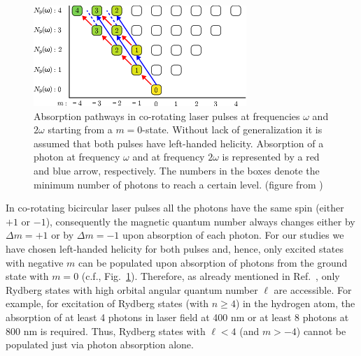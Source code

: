 \begin{figure}[!ht]
 \centering
  \includegraphics[width=0.75\columnwidth]{figs/Rydberg/co_rotating_absorbtion.png}
 \caption{\label{fig:co-pathways}
 Absorption pathways in co-rotating laser pulses at frequencies $\omega$ and $2 \omega$ starting from a $m=0$-state. Without lack of generalization it is assumed that both pulses have left-handed helicity. Absorption of a photon at frequency $\omega$ and at frequency $2 \omega$ is represented by a red and blue arrow, respectively. The numbers in the boxes denote the minimum number of photons to reach a certain level. (figure from \cite{venzke2020_ryd})
 }
 \end{figure}

In co-rotating bicircular laser pulses all the photons have the same spin (either $+1$ or $-1$), consequently the magnetic quantum number always changes either by $\Delta m = +1$ or by $\Delta m = -1$ upon absorption of each photon. For our studies we have chosen left-handed helicity for both pulses and, hence, only excited states with negative $m$ can be populated upon absorption of photons from the ground state with $m=0$ (c.f., Fig.\ \ref{fig:co-pathways}). Therefore, as already mentioned in Ref.\ \cite{mancuso2017}, only Rydberg states with high orbital angular quantum number $\ell$ are accessible. For example, for excitation of Rydberg states (with $n \ge 4$) in the hydrogen atom, the absorption of at least 4 photons in laser field at 400 nm or at least 8 photons at 800 nm is required. Thus, Rydberg states with $\ell < 4$ (and $m > -4$) cannot be populated just via photon absorption alone.

